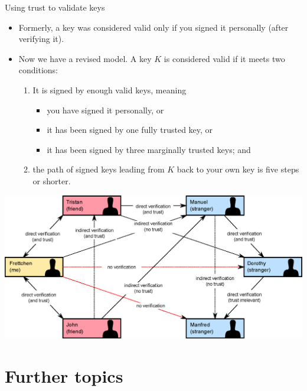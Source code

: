 \documentclass[
mode=present,
paper=smartboard,
size=20pt,
]{powerdot}
\begin{document}
\begin{slide}{Using trust to validate keys}
  \begin{itemize}
  \item Formerly, a key was considered valid only if you signed it
    personally (after verifying it).
  \item Now we have a revised model.  A key $K$ is considered valid if
    it meets two conditions:
    \begin{enumerate}
    \item It is signed by enough valid keys, meaning
      \begin{itemize}
      \item you have signed it personally, or
      \item it has been signed by one fully trusted key, or
      \item it has been signed by three marginally trusted keys; and
      \end{itemize}
    \item the path of signed keys leading from $K$ back to your own
      key is five steps or shorter.
    \end{enumerate}
  \end{itemize}
\end{slide}

\begin{slide}[toc=]{}
\centering\includegraphics[width=\linewidth]{images/Web_of_Trust_2.eps}
\end{slide}

\section{Further topics}
\end{document}
